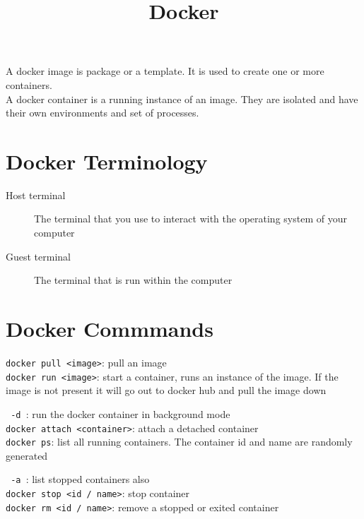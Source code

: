 \documentclass[french]{article}
\title{Docker}
\begin{document}
\date{}

\maketitle

A docker image is package or a template. It is used to create one or more containers.\\

A docker container is a running instance of an image. They are isolated and have their own environments and set of processes.

\section{Docker Terminology}

\begin{description}
    \item[Host terminal] The terminal that you use to interact with the operating system of your computer
    \item[Guest terminal] The terminal that is run within the computer
\end{description}

\section{Docker Commmands}

\verb|docker pull <image>|: pull an image\\

\verb|docker run <image>|: start a container, runs an instance of the image. If the image is not present it will go out to docker hub and pull the image down

\verb| -d |: run the docker container in background mode\\

\verb|docker attach <container>|: attach a detached container\\

\verb|docker ps|: list all running containers. The container id and name are randomly generated

\verb| -a |: list stopped containers also\\

\verb|docker stop <id / name>|: stop container\\

\verb|docker rm <id / name>|: remove a stopped or exited container\\
\end{document}
